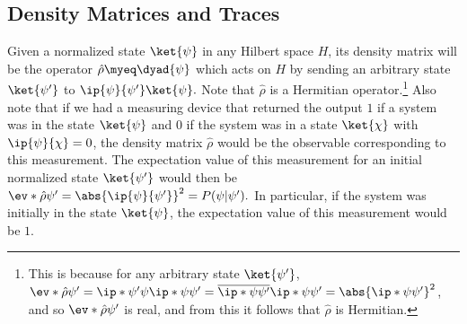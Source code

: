     \subsection{Density Matrices and Traces}
    Given a normalized state $\ket{\psi}$ in any Hilbert space $H$,  its density matrix will be the operator $\hat{\rho}\myeq\dyad{\psi}$ which acts on $H$ by sending an arbitrary state $\ket{\psi'}$ to $\ip{\psi}{\psi'}\ket{\psi}.$  Note that $\hat{\rho}$ is a Hermitian operator.\footnote{This is because for any arbitrary state $\ket{\psi'}$, $\ev*{\hat{\rho}}{{\psi'}} = \ip*{\psi'}{\psi} \ip*{\psi}{\psi'}=\overline{\ip*{\psi}{\psi'}}\ip*{\psi}{\psi'}=\abs{\ip*{\psi}{\psi'}}^2$, and so $\ev*{\hat{\rho}}{{\psi'}}$ is real, and from this it follows that $\hat{\rho}$ is Hermitian. } Also note that if we had a measuring device that returned the output $1$ if a system was in the state $\ket{\psi}$ and $0$ if the system was in a state $\ket{\chi}$ with $\ip{\psi}{\chi}=0$, the density matrix $\hat{\rho}$ would be the observable corresponding to this measurement. The expectation value of this measurement for an initial normalized state $\ket{\psi'}$ would then be $\ev*{\hat{\rho}}{\psi'}=\abs{\ip{\psi}{\psi'}}^2=P(\psi|\psi').$ In particular, if the system was initially in the state $\ket{\psi}$, the expectation value of this measurement would be $1$.
    
